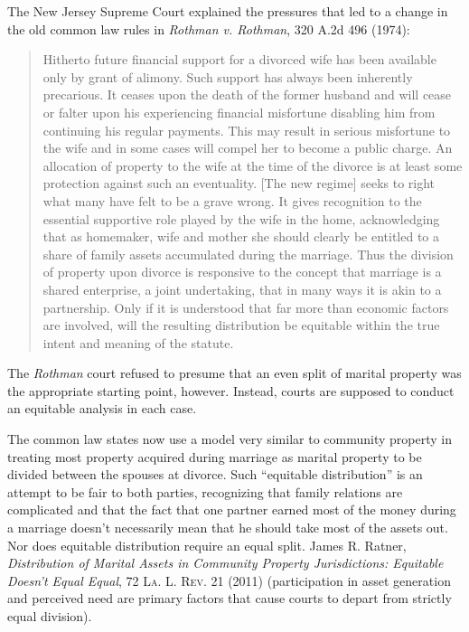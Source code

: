 The New Jersey Supreme Court explained the pressures that led to a change in the
old common law rules in \emph{Rothman v. Rothman}, 320 A.2d 496 (1974):
\begin{quote}
Hitherto future financial support for a divorced wife has been available only by
grant of alimony. Such support has always been inherently precarious. It ceases
upon the death of the former husband and will cease or falter upon his
experiencing financial misfortune disabling him from continuing his regular
payments. This may result in serious misfortune to the wife and in some cases
will compel her to become a public charge. An allocation of property to the
wife at the time of the divorce is at least some protection against such an
eventuality. [The new regime] seeks to right what many have felt to be a grave
wrong. It gives recognition to the essential supportive role played by the wife
in the home, acknowledging that as homemaker, wife and mother she should
clearly be entitled to a share of family assets accumulated during the
marriage. Thus the division of property upon divorce is responsive to the
concept that marriage is a shared enterprise, a joint undertaking, that in many
ways it is akin to a partnership. Only if it is understood that far more than
economic factors are involved, will the resulting distribution be equitable
within the true intent and meaning of the statute.
\end{quote}
The \textit{Rothman} court refused to presume that an even split of marital
property was the appropriate starting point, however. Instead, courts are
supposed to conduct an equitable analysis in each case.

The common law states now use a model very similar to community property in
treating most property acquired during marriage as marital property to be
divided between the spouses at divorce. Such ``equitable distribution'' is an
attempt to be fair to both parties, recognizing that family relations are
complicated and that the fact that one partner earned most of the money during
a marriage doesn't necessarily mean that he should take most of the assets out.
Nor does equitable distribution require an equal split. James R. Ratner,
\emph{Distribution of Marital Assets in Community Property Jurisdictions:
Equitable Doesn't Equal Equal}, 72 \textsc{La. L. Rev.} 21 (2011) (participation
in asset generation and perceived need are primary factors that cause courts to
depart from strictly equal division).

